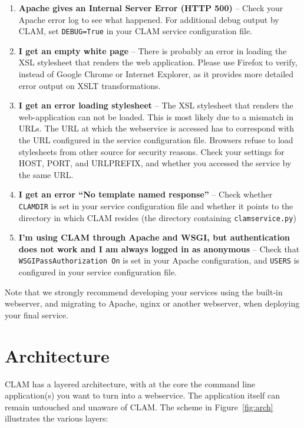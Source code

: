 \documentclass[a4paper,12pt]{report}
\begin{document}
\begin{enumerate}
\item \textbf{Apache gives an Internal Server Error (HTTP 500)} -- Check your Apache error log to see what happened. For additional debug output by CLAM, set \texttt{DEBUG=True} in your CLAM service configuration file. 
\item \textbf{I get an empty white page} -- There is probably an error in loading the XSL stylesheet that renders the web application. Please use Firefox to verify, instead of Google Chrome or Internet Explorer, as it provides more detailed error output on XSLT transformations.
\item \textbf{I get an error loading stylesheet} -- The XSL stylesheet that renders the web-application can not be loaded. This is most likely due to a mismatch in URLs. The URL at which the webservice is accessed has to correspond with the URL configured in the service configuration file. Browsers refuse to load stylesheets from other source for security reasons. Check your settings for HOST, PORT,  and URLPREFIX, and whether you accessed the service by the same URL.
\item \textbf{I get an error ``No template named response''} -- Check whether
  \texttt{CLAMDIR} is set in your service configuration file and whether it points to the directory in which CLAM resides (the directory containing \texttt{clamservice.py})
\item \textbf{I'm using CLAM through Apache and WSGI, but authentication does not work and I am always logged in as anonymous} -- Check that \texttt{WSGIPassAuthorization On} is set in your Apache configuration, and \texttt{USERS} is configured in your service configuration file.
\end{enumerate}

Note that we strongly recommend developing your services using the built-in
webserver, and migrating to Apache, nginx or another webserver, when deploying
your final service.

\section{Architecture}

CLAM has a layered architecture, with at the core the command line application(s) you
want to turn into a webservice. The application itself can remain untouched and
unaware of CLAM. The scheme in Figure~\ref{fig:arch} illustrates the various
layers:
\end{document}
